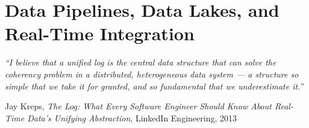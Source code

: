 
\chapter{Data Pipelines, Data Lakes, and Real-Time Integration}
\label{ch:pipelines}

\epigraph{\textit{``I believe that a unified log is the central data structure
that can solve the coherency problem in a distributed, heterogeneous data system
--- a structure so simple that we take it for granted, and so fundamental that
we underestimate it.''}}{Jay Kreps, \textit{The Log: What Every Software
Engineer Should Know About Real-Time Data's Unifying Abstraction},
LinkedIn Engineering, 2013}

\vspace{4pt}

